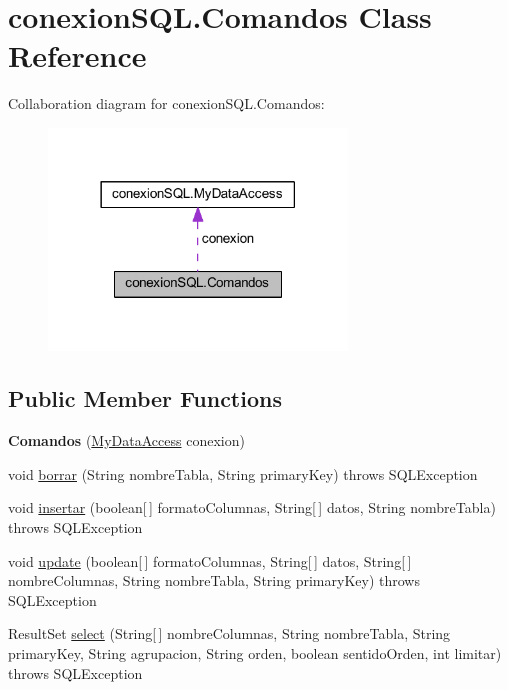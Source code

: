 \hypertarget{classconexion_s_q_l_1_1_comandos}{}\section{conexion\+S\+Q\+L.\+Comandos Class Reference}
\label{classconexion_s_q_l_1_1_comandos}


Collaboration diagram for conexion\+S\+Q\+L.\+Comandos\+:
\nopagebreak
\begin{figure}[H]
\begin{center}
\leavevmode
\includegraphics[width=225pt]{classconexion_s_q_l_1_1_comandos__coll__graph}
\end{center}
\end{figure}
\subsection*{Public Member Functions}
\begin{DoxyCompactItemize}
\item 
\mbox{\label{classconexion_s_q_l_1_1_comandos_a9198892a41e99577789c9091deb4e23f}} 
{\bfseries Comandos} (\mbox{\hyperlink{classconexion_s_q_l_1_1_my_data_access}{My\+Data\+Access}} conexion)
\item 
void \mbox{\hyperlink{classconexion_s_q_l_1_1_comandos_a1a53c5650458c357ecd43cfc2734ad83}{borrar}} (String nombre\+Tabla, String primary\+Key)  throws S\+Q\+L\+Exception 
\item 
void \mbox{\hyperlink{classconexion_s_q_l_1_1_comandos_a2fb20845cbfb01a03b1aba60031608cb}{insertar}} (boolean\mbox{[}$\,$\mbox{]} formato\+Columnas, String\mbox{[}$\,$\mbox{]} datos, String nombre\+Tabla)  throws S\+Q\+L\+Exception 
\item 
void \mbox{\hyperlink{classconexion_s_q_l_1_1_comandos_af07c35c78a263c1a1ffb4661f1829e20}{update}} (boolean\mbox{[}$\,$\mbox{]} formato\+Columnas, String\mbox{[}$\,$\mbox{]} datos, String\mbox{[}$\,$\mbox{]} nombre\+Columnas, String nombre\+Tabla, String primary\+Key)  throws S\+Q\+L\+Exception 
\item 
Result\+Set \mbox{\hyperlink{classconexion_s_q_l_1_1_comandos_aa1dc46cfa52b931d7252da826880372d}{select}} (String\mbox{[}$\,$\mbox{]} nombre\+Columnas, String nombre\+Tabla, String primary\+Key, String agrupacion, String orden, boolean sentido\+Orden, int limitar)  throws S\+Q\+L\+Exception 
\end{DoxyCompactItemize}


